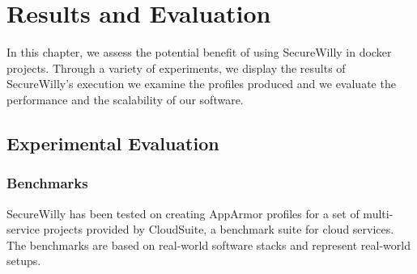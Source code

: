 \chapter{Results and Evaluation}

In this chapter, we assess the potential benefit of using SecureWilly in docker projects. Through a variety of experiments, we display the results of SecureWilly's execution we examine the profiles produced and we evaluate the performance and the scalability of our software.

\section{Experimental Evaluation}
\subsection{Benchmarks}
SecureWilly has been tested on creating AppArmor profiles for a set of multi-service projects provided by CloudSuite, a benchmark suite for cloud services. \cite{cloudsuite} The benchmarks are based on real-world software stacks and represent real-world setups. 

